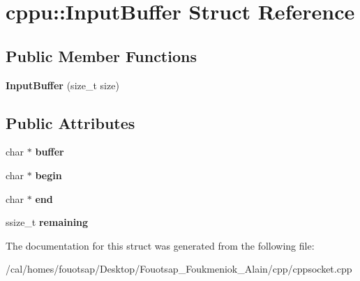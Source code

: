 \hypertarget{structcppu_1_1_input_buffer}{\section{cppu\+:\+:Input\+Buffer Struct Reference}
\label{structcppu_1_1_input_buffer}
}
\subsection*{Public Member Functions}
\begin{DoxyCompactItemize}
\item 
\hypertarget{structcppu_1_1_input_buffer_ac50e17e3cfb76a2983e5e3d4558b8144}{{\bfseries Input\+Buffer} (size\+\_\+t size)}\label{structcppu_1_1_input_buffer_ac50e17e3cfb76a2983e5e3d4558b8144}

\end{DoxyCompactItemize}
\subsection*{Public Attributes}
\begin{DoxyCompactItemize}
\item 
\hypertarget{structcppu_1_1_input_buffer_a85138068e2e10731e46784b1552bc354}{char $\ast$ {\bfseries buffer}}\label{structcppu_1_1_input_buffer_a85138068e2e10731e46784b1552bc354}

\item 
\hypertarget{structcppu_1_1_input_buffer_adbd6fb30fe51a192c9bbba6333016f31}{char $\ast$ {\bfseries begin}}\label{structcppu_1_1_input_buffer_adbd6fb30fe51a192c9bbba6333016f31}

\item 
\hypertarget{structcppu_1_1_input_buffer_ac9fb4f51a6db191e71976fcda20237c0}{char $\ast$ {\bfseries end}}\label{structcppu_1_1_input_buffer_ac9fb4f51a6db191e71976fcda20237c0}

\item 
\hypertarget{structcppu_1_1_input_buffer_a646b547733665524fa8b5de6b093ab11}{ssize\+\_\+t {\bfseries remaining}}\label{structcppu_1_1_input_buffer_a646b547733665524fa8b5de6b093ab11}

\end{DoxyCompactItemize}


The documentation for this struct was generated from the following file\+:\begin{DoxyCompactItemize}
\item 
/cal/homes/fouotsap/\+Desktop/\+Fouotsap\+\_\+\+Foukmeniok\+\_\+\+Alain/cpp/cppsocket.\+cpp\end{DoxyCompactItemize}
